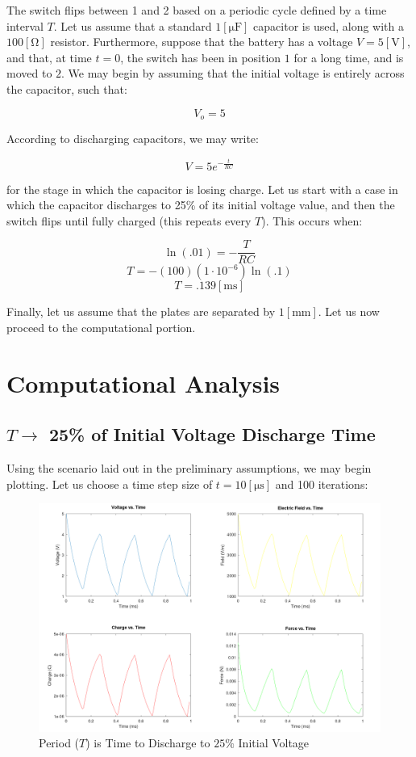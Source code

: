 The switch flips between 1 and 2 based on a periodic cycle defined by a time interval $T$. Let us assume that a standard $1[\si{\micro\farad}]$ capacitor is used, along with a $100[\si{\ohm}]$ resistor. Furthermore, suppose that the battery has a voltage $V=5[\si{\volt}]$, and that, at time $t=0$, the switch has been in position $1$ for a long time, and is moved to $2$. We may begin by assuming that the initial voltage is entirely across the capacitor, such that:

$$V_o=5$$

According to discharging capacitors, we may write:

$$V=5e^{-\frac{t}{RC}}$$

for the stage in which the capacitor is losing charge. Let us start with a case in which the capacitor discharges to 25\% of its initial voltage value, and then the switch flips until fully charged (this repeats every $T$). This occurs when:

$$\ln\left( .01 \right)=-\frac{T}{RC}$$
$$T=-(100)(1\cdot10^{-6})\ln(.1)$$
$$T=.139[\si{\milli\second}]$$

Finally, let us assume that the plates are separated by $1[\si{\milli\meter}]$. Let us now proceed to the computational portion.

\newpage

\section{Computational Analysis}

\subsection{$T\to$ 25\% of Initial Voltage Discharge Time}

Using the scenario laid out in the preliminary assumptions, we may begin plotting. Let us choose a time step size of $t=10[\si{\micro\second}]$ and 100 iterations:

\begin{center}
  \begin{figure}[H]
    \centering
    \includegraphics[width=.9\textwidth]{Figures/QuarterT.png}
    \caption{Period ($T$) is Time to Discharge to $25\%$ Initial Voltage}
    \label{fig:2}
  \end{figure}
\end{center}

